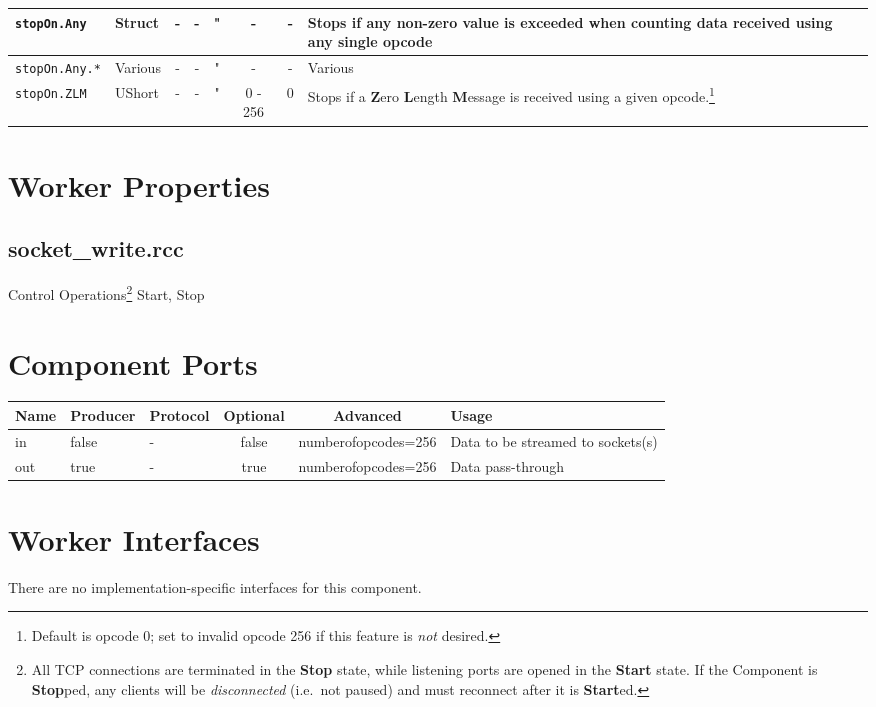 \documentclass{article}
\def\comp{socket\_write}
\begin{document}
\begin{landscape}
\begin{minipage}{\textwidth}
\begin{scriptsize}
\begin{tabular}{|p{3cm}|p{1.5cm}|c|c|c|c|c|p{7cm}|}
      \hline
      \verb+stopOn.Any+             & Struct    & -              & -               & "                  & -           & -             & Stops if any non-zero value is exceeded when counting data received using any single opcode \\
      \hline
      \verb+stopOn.Any.*+           & Various   & -              & -               & "                  & -           & -             & Various \\
      \hline
      \verb+stopOn.ZLM+             & UShort    & -              & -               & "                  & 0 - 256     & 0             & Stops if a \textbf{Z}ero \textbf{L}ength \textbf{M}essage is received using a given opcode.\footnote{Default is opcode 0; set to invalid opcode 256 if this feature is \textit{not} desired.} \\
      \hline
    \end{tabular}
  \end{scriptsize}
  \end{minipage}
  \section*{Worker Properties}
  \subsection*{\comp.rcc}
  Control Operations\footnote{All TCP connections are terminated in the \textbf{Stop} state, while listening ports are opened in the \textbf{Start} state. If the Component is \textbf{Stop}ped, any clients will be \emph{disconnected} (i.e.\ not paused) and must reconnect after it is \textbf{Start}ed.} Start, Stop

  \section*{Component Ports}
  \begin{scriptsize}
    \begin{tabular}{|M{2cm}|M{1.5cm}|M{4cm}|c|c|M{9cm}|}
      \hline
      Name & Producer & Protocol & Optional & Advanced            & Usage \\
      \hline
      in   & false    & -        & false    & numberofopcodes=256 & Data to be streamed to sockets(s) \\
      \hline
      out  & true     & -        & true     & numberofopcodes=256 & Data pass-through \\
      \hline
    \end{tabular}
  \end{scriptsize}

  \section*{Worker Interfaces}
  There are no implementation-specific interfaces for this component.
\end{landscape}
\end{document}
